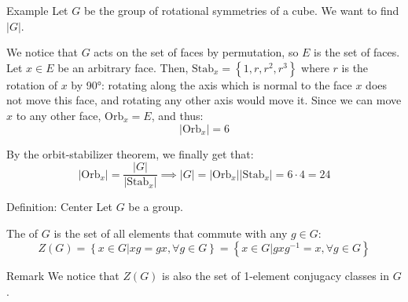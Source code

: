 \documentclass[a4paper]{article}
\begin{document}
\begin{parag}{Example}
    Let $G$ be the group of rotational symmetries of a cube. We want to find $\left|G\right|$.

    We notice that $G$ acts on the set of faces by permutation, so $E$ is the set of faces. Let $x \in E$ be an arbitrary face. Then, $\text{Stab}_x = \left\{1, r, r^2, r^3\right\}$ where $r$ is the rotation of $x$ by 90°: rotating along the axis which is normal to the face $x$ does not move this face, and rotating any other axis would move it. Since we can move $x$ to any other face, $\text{Orb}_x = E$, and thus: 
    \[\left|\text{Orb}_x\right| = 6\]
    
    By the orbit-stabilizer theorem, we finally get that: 
    \[\left|\text{Orb}_x\right| = \frac{\left|G\right|}{\left|\text{Stab}_x\right|} \implies \left|G\right| = \left|\text{Orb}_x\right|\left|\text{Stab}_x\right| = 6\cdot4 = 24\]
\end{parag}

\begin{parag}{Definition: Center}
    Let $G$ be a group.

    The  of $G$ is the set of all elements that commute with any $g \in G$: 
    \[Z\left(G\right) = \left\{x \in G | xg = gx, \forall g \in G\right\} = \left\{x \in G | g x g^{-1} = x, \forall g \in G\right\}\]
    
    \begin{subparag}{Remark}
        We notice that $Z\left(G\right)$ is also the set of 1-element conjugacy classes in $G$.
    \end{subparag}
\end{parag}
\end{document}
